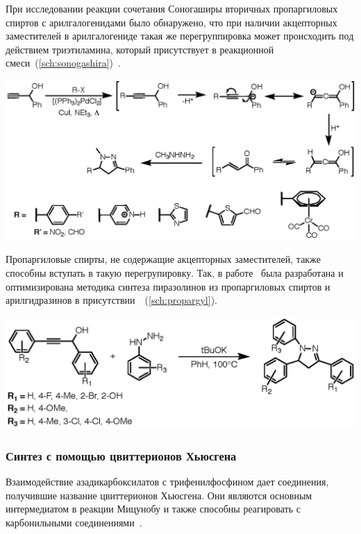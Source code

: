 При исследовании реакции сочетания Соногаширы вторичных пропаргиловых спиртов с \mbox{арилгалогенидами} было обнаружено, что при наличии акцепторных заместителей в \mbox{арилгалогениде} такая же перегруппировка может происходить под действием триэтиламина, который присутствует в реакционной смеси~(\ref{sch:sonogashira})~\cite{Muller2000}.

\begin{scheme}[h!]
    \centering
    \includegraphics{sections/literature/img/sonogashira.eps}
    \caption{}
    \label{sch:sonogashira}
\end{scheme}

Пропаргиловые спирты, не содержащие акцепторных заместителей, также способны вступать в такую перегрупировку.
Так, в работе~\cite{Wang2014} была разработана и оптимизирована методика синтеза пиразолинов из пропаргиловых спиртов и арилгидразинов в присутствии~~(\ref{sch:propargyl}).

\begin{scheme}[h!]
    \centering
    \includegraphics{sections/literature/img/propargyl.eps}
    \caption{}
    \label{sch:propargyl}
\end{scheme}


\FloatBarrier{}

\subsubsection{Синтез с помощью цвиттерионов Хьюсгена}
Взаимодействие азадикарбоксилатов с трифенилфосфином дает соединения, получившие название цвиттерионов Хьюсгена.
Они являются основным интермедиатом в реакции Мицунобу и также способны реагировать с карбонильными соединениями~\cite{Otte2005}.


